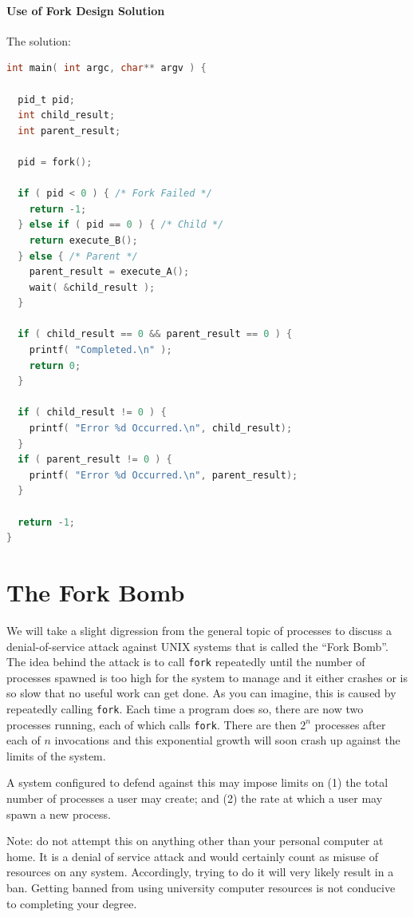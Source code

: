 \paragraph{Use of Fork Design Solution} The solution:

\begin{lstlisting}[language=C]
int main( int argc, char** argv ) {

  pid_t pid;
  int child_result;
  int parent_result;

  pid = fork();
  
  if ( pid < 0 ) { /* Fork Failed */
    return -1;
  } else if ( pid == 0 ) { /* Child */
    return execute_B();
  } else { /* Parent */ 
    parent_result = execute_A();
    wait( &child_result );
  }
  
  if ( child_result == 0 && parent_result == 0 ) {
    printf( "Completed.\n" );
    return 0;
  }
  
  if ( child_result != 0 ) {
    printf( "Error %d Occurred.\n", child_result);
  }
  if ( parent_result != 0 ) {
    printf( "Error %d Occurred.\n", parent_result);
  }
  
  return -1;
}
\end{lstlisting}


\section*{The Fork Bomb}

We will take a slight digression from the general topic of processes to discuss a denial-of-service attack against UNIX systems that is called the ``Fork Bomb''. The idea behind the attack is to call \texttt{fork} repeatedly until the number of processes spawned is too high for the system to manage and it either crashes or is so slow that no useful work can get done. As you can imagine, this is caused by repeatedly calling \texttt{fork}. Each time a program does so, there are now two processes running, each of which calls \texttt{fork}. There are then $2^{n}$ processes after each of $n$ invocations and this exponential growth will soon crash up against the limits of the system.

A system configured to defend against this may impose limits on (1) the total number of processes a user may create; and (2) the rate at which a user may spawn a new process.

Note: do not attempt this on anything other than your personal computer at home. It is a denial of service attack and would certainly count as misuse of resources on any system. Accordingly, trying to do it will very likely result in a ban. Getting banned from using university computer resources is not conducive to completing your degree.


